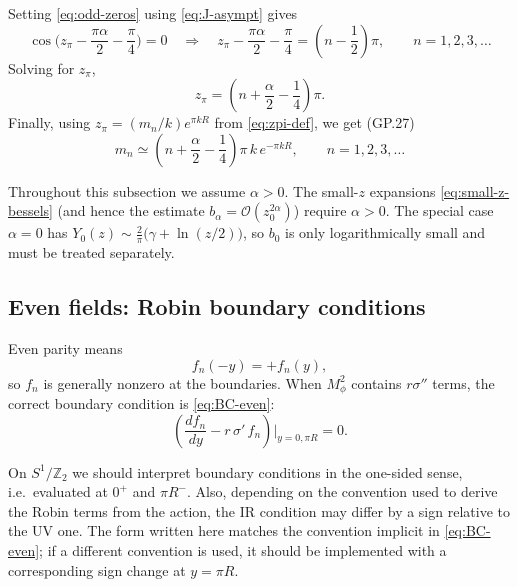 \documentclass[11pt]{article}
\begin{document}
Setting \eqref{eq:odd-zeros} using \eqref{eq:J-asympt} gives
\begin{equation}
\cos\!\Big(z_\pi-\frac{\pi\alpha}{2}-\frac{\pi}{4}\Big)=0
\quad\Longrightarrow\quad
z_\pi-\frac{\pi\alpha}{2}-\frac{\pi}{4}=\left(n-\frac{1}{2}\right)\pi,
\qquad n=1,2,3,\dots
\label{eq:odd-phase}
\end{equation}
Solving for $z_\pi$,
\begin{equation}
z_\pi=\left(n+\frac{\alpha}{2}-\frac{1}{4}\right)\pi.
\label{eq:odd-zpi}
\end{equation}
Finally, using $z_\pi=(m_n/k)e^{\pi kR}$ from \eqref{eq:zpi-def}, we get (GP.27)
\begin{equation}
\boxed{
m_n \simeq \left(n+\frac{\alpha}{2}-\frac{1}{4}\right)\pi\,k\,e^{-\pi kR},
\qquad n=1,2,3,\dots
}
\label{eq:mn-odd}
\end{equation}
\begin{notationbox}
  Throughout this subsection we assume $\alpha>0$. The small-$z$ expansions
  \eqref{eq:small-z-bessels} (and hence the estimate $b_\alpha=\mathcal O(z_0^{2\alpha})$)
  require $\alpha>0$. The special case $\alpha=0$ has $Y_0(z)\sim \tfrac{2}{\pi}\big(\gamma+\ln(z/2)\big)$,
  so $b_0$ is only logarithmically small and must be treated separately.
\end{notationbox}

\subsection{Even fields: Robin boundary conditions}

Even parity means
\begin{equation}
f_n(-y)=+f_n(y),
\label{eq:even-parity}
\end{equation}
so $f_n$ is generally nonzero at the boundaries. When $M_\phi^2$ contains $r\sigma''$ terms,
the correct boundary condition is \eqref{eq:BC-even}:
\[
\left(\frac{df_n}{dy}-r\,\sigma'\,f_n\right)\Big|_{y=0,\pi R}=0.
\]
\begin{notationbox}
On $S^1/\mathbb Z_2$ we should interpret boundary conditions in the one-sided sense, i.e.\
evaluated at $0^+$ and $\pi R^-$. Also, depending on the convention used to derive the Robin terms from the action, the IR condition may differ by a sign relative to the UV one. The form written here matches the convention implicit in \eqref{eq:BC-even}; if a different convention is used, it should be implemented with a corresponding sign change at $y=\pi R$.
\end{notationbox}
\end{document}
